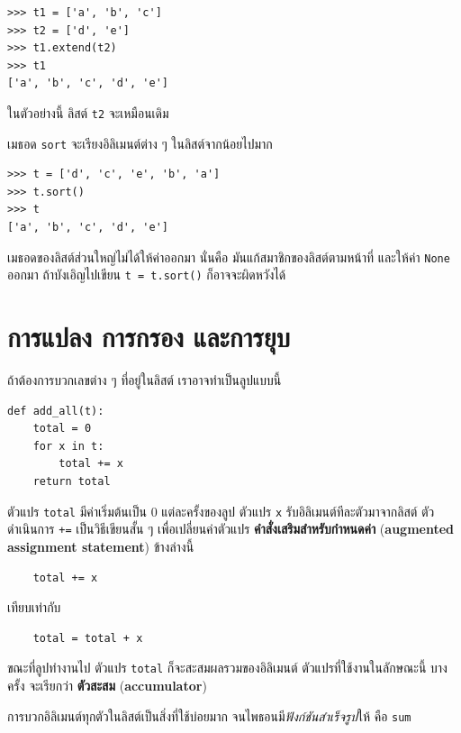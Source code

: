 \begin{verbatim}
>>> t1 = ['a', 'b', 'c']
>>> t2 = ['d', 'e']
>>> t1.extend(t2)
>>> t1
['a', 'b', 'c', 'd', 'e']
\end{verbatim}
%
ในตัวอย่างนี้ ลิสต์ \texttt{t2} จะเหมือนเดิม

เมธอด \texttt{sort} จะเรียงอิลิเมนต์ต่าง ๆ ในลิสต์จากน้อยไปมาก

\begin{verbatim}
>>> t = ['d', 'c', 'e', 'b', 'a']
>>> t.sort()
>>> t
['a', 'b', 'c', 'd', 'e']
\end{verbatim}
%
เมธอดของลิสต์ส่วนใหญ่ไม่ได้ให้ค่าออกมา
นั่นคือ มันแก้สมาชิกของลิสต์ตามหน้าที่ และให้ค่า \texttt{None} ออกมา
ถ้าบังเอิญไปเขียน \texttt{t = t.sort()}
ก็อาจจะผิดหวังได้

\section{การแปลง การกรอง และการยุบ}
\label{filter}

ถ้าต้องการบวกเลขต่าง ๆ ที่อยู่ในลิสต์
เราอาจทำเป็นลูปแบบนี้


\begin{verbatim}
def add_all(t):
    total = 0
    for x in t:
        total += x
    return total
\end{verbatim}
%
ตัวแปร \texttt{total} มีค่าเริ่มต้นเป็น 0
แต่ละครั้งของลูป
ตัวแปร \texttt{x} รับอิลิเมนต์ทีละตัวมาจากลิสต์  
ตัวดำเนินการ \texttt{+=} เป็นวิธีเขียนสั้น ๆ เพื่อเปลี่ยนค่าตัวแปร
\textbf{คำสั่งเสริมสำหรับกำหนดค่า} (\textbf{augmented assignment statement}) ข้างล่างนี้


\begin{verbatim}
    total += x
\end{verbatim}
%
เทียบเท่ากับ

\begin{verbatim}
    total = total + x
\end{verbatim}
%
ขณะที่ลูปทำงานไป ตัวแปร \texttt{total} ก็จะสะสมผลรวมของอิลิเมนต์
ตัวแปรที่ใช้งานในลักษณะนี้ บางครั้ง จะเรียกว่า \textbf{ตัวสะสม} (\textbf{accumulator})

การบวกอิลิเมนต์ทุกตัวในลิสต์เป็นสิ่งที่ใช้บ่อยมาก จนไพธอนมี\textit{ฟังก์ชันสำเร็จรูป}ให้ คือ \texttt{\tt sum}

